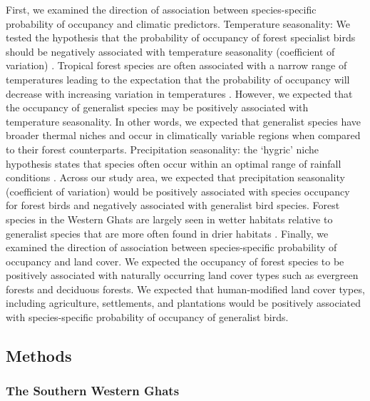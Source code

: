 First, we examined the direction of association between species-specific probability of occupancy and climatic predictors.
Temperature seasonality: We tested the hypothesis that the probability of occupancy of forest specialist birds should be negatively associated with temperature seasonality (coefficient of variation) \citep{srinivasan2018}.
Tropical forest species are often associated with a narrow range of temperatures leading to the expectation that the probability of occupancy will decrease with increasing variation in temperatures \citep{janzen1967,stevens1989,frishkoff2016,chan2016,srinivasan2018}.
However, we expected that the occupancy of generalist species may be positively associated with temperature seasonality.
In other words, we expected that generalist species have broader thermal niches and occur in climatically variable regions when compared to their forest counterparts.
Precipitation seasonality: the `hygric' niche hypothesis states that species often occur within an optimal range of rainfall conditions \citep{boyle2020}.
Across our study area, we expected that precipitation seasonality (coefficient of variation) would be positively associated with species occupancy for forest birds and negatively associated with generalist bird species.
Forest species in the Western Ghats are largely seen in wetter habitats relative to generalist species that are more often found in drier habitats \citep{raman2006}.
Finally, we examined the direction of association between species-specific probability of occupancy and land cover.
We expected the occupancy of forest species to be positively associated with naturally occurring land cover types such as evergreen forests and deciduous forests.
We expected that human-modified land cover types, including agriculture, settlements, and plantations would be positively associated with species-specific probability of occupancy of generalist birds.

\subsection*{Methods}

\subsubsection*{The Southern Western Ghats}

